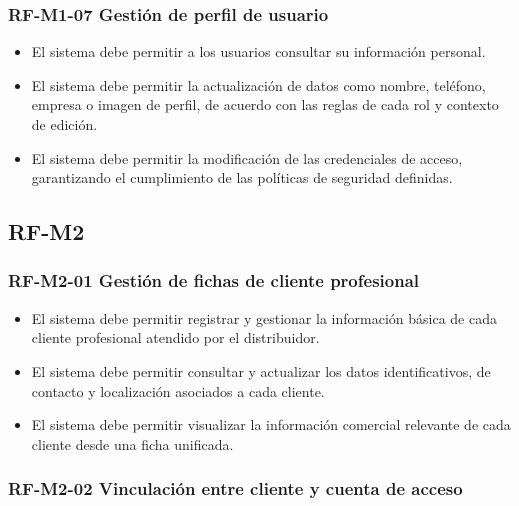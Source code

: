 \vspace{-0.75em}
\subsubsection{RF-M1-07 Gestión de perfil de usuario}
\vspace{-1em}

\begin{itemize}
    \item El sistema debe permitir a los usuarios consultar su información personal.
    \item El sistema debe permitir la actualización de datos como nombre, teléfono, empresa o imagen de perfil, de acuerdo con las reglas de cada rol y contexto de edición.
    \item El sistema debe permitir la modificación de las credenciales de acceso, garantizando el cumplimiento de las políticas de seguridad definidas.
\end{itemize}

\subsection{RF-M2}

\vspace{-0.75em}
\subsubsection{RF-M2-01 Gestión de fichas de cliente profesional}
\vspace{-1em}

\begin{itemize}
    \item El sistema debe permitir registrar y gestionar la información básica de cada cliente profesional atendido por el distribuidor.
    \item El sistema debe permitir consultar y actualizar los datos identificativos, de contacto y localización asociados a cada cliente.
    \item El sistema debe permitir visualizar la información comercial relevante de cada cliente desde una ficha unificada.
\end{itemize}

\vspace{-0.75em}
\subsubsection{RF-M2-02 Vinculación entre cliente y cuenta de acceso}
\vspace{-1em}

